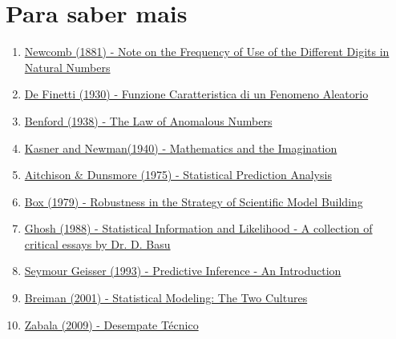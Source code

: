 \documentclass{beamer}\usepackage[]{graphicx}\usepackage[]{xcolor}
\begin{document}
\section{Para saber mais}
\begin{frame}{\secname}
\fontsize{9pt}{9pt}\selectfont
  \begin{enumerate}
  \itemsep.5em
  	\item \href{https://www.jstor.org/stable/2369148}{Newcomb (1881) - Note on the Frequency of Use of the Different Digits in Natural Numbers}
  	\item \href{http://www.brunodefinetti.it/Opere/funzioneCaratteristica.pdf}{De Finetti (1930) - Funzione Caratteristica di un Fenomeno Aleatorio}
  	\item \href{https://isidore.co/misc/Physics\%20papers\%20and\%20books/Zotero/storage/ZEBWDL73/Benford\%20-\%201938\%20-\%20The\%20Law\%20of\%20Anomalous\%20Numbers.pdf}{Benford (1938) - The Law of Anomalous Numbers}
  	\item \href{https://archive.org/details/mathematicsimagi00kasnrich}{Kasner and Newman(1940) - Mathematics and the
Imagination}
  	\item \href{https://doi.org/10.1017/CBO9780511569647}{Aitchison \& Dunsmore (1975) - Statistical Prediction Analysis}
  	\item \href{https://www.sciencedirect.com/science/article/abs/pii/B9780124381506500182}{Box (1979) - Robustness in the Strategy of Scientific Model Building}
    \item \href{https://link.springer.com/book/10.1007/978-1-4612-3894-2}{Ghosh (1988) - Statistical Information and Likelihood - A collection of critical essays by Dr. D. Basu}
    \item \href{https://doi.org/10.1201/9780203742310}{Seymour Geisser (1993) - Predictive Inference - An Introduction}
    \item \href{https://projecteuclid.org/euclid.ss/1009213726}{Breiman (2001) - Statistical Modeling: The Two Cultures}
    \item \href{https://doi.org/10.11606/D.45.2009.tde-01032021-140004}{Zabala (2009) - Desempate Técnico}
	\end{enumerate}
\end{frame}
\end{document}
